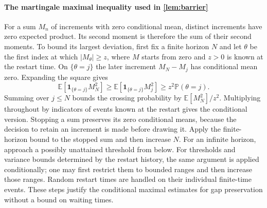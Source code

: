 \documentclass[twoside,11pt]{article}
\DeclareRobustCommand{\reviewbarstart}{%
  \ifhmode %
    \vadjust{\vbox to 0pt{%
      \vskip-\ht\strutbox %
      \vskip-\dp\strutbox %
      \cbstart[\changebarwidth] %
      \vss %
    }}%
  \else %
    \cbstart[\changebarwidth]%
  \fi %
} %
\providecommand{\DIFadd}[1]{#1} %
\providecommand{\DIFaddbegin}{\reviewbarstart} %
\providecommand{\DIFaddend}{\protect\cbend} %
\def\DIFadd#1{#1}%
\def\DIFaddbegin{}%
\def\DIFaddend{}%
\begin{document}
 \DIFaddbegin \paragraph{\DIFadd{The martingale maximal inequality used in \autoref{lem:barrier}}}
\label{app: martingale bound}
\DIFadd{For a sum $M_n$ of increments with zero conditional mean, distinct increments have zero expected product. Its second moment is therefore the sum of their second moments. To bound its largest deviation, first fix a finite horizon $N$ and }\DIFaddend let  \DIFaddbegin \DIFadd{$\theta$ be the first index at which $|M_\theta|\ge z$, where $M$ starts from zero and $z>0$ is known at the restart time.
On $\{\theta=j\}$ the later increment $M_N-M_j$ has conditional mean zero. Expanding the square gives
}\[
\DIFadd{\mathbb E}[\DIFadd{\mathbf1_{\{\theta=j\}}M_N^2}]
\DIFadd{\ge \mathbb E}[\DIFadd{\mathbf1_{\{\theta=j\}}M_j^2}]
\DIFadd{\ge z^2\mathbb P(\theta=j).
}\]
\DIFadd{Summing over $j\le N$ bounds the crossing probability by $\mathbb E[M_N^2]/z^2$.
Multiplying throughout by indicators of events known at the restart gives the conditional version. Stopping a sum preserves its zero conditional means, because the decision to retain an increment is made before drawing it. Apply the finite-horizon bound to the stopped sum and then increase $N$. For an infinite horizon, approach a possibly unattained threshold from below. For thresholds and variance bounds determined by the restart history, }\DIFaddend the  \DIFaddbegin \DIFadd{same argument is applied conditionally; one may first restrict them to bounded ranges and then increase those ranges. Random restart times are handled on their individual finite-time events. These steps justify the conditional maximal estimates for gap preservation without a bound on waiting times.
}\DIFaddend 




 \DIFaddbegin {}


\DIFaddend 




\end{document}
